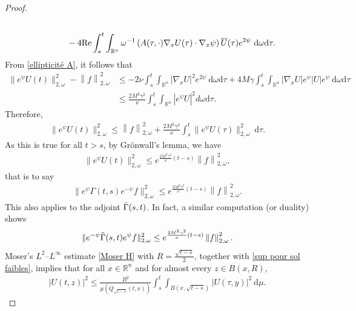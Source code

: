 \documentclass[12pt, letterpaper]{amsart}
\theoremstyle{definition}
\theoremstyle{remark}
\numberwithin{equation}{section}
\begin{document}
\begin{proof}
\begin{align*}
    \\ & \hspace{1.5cm}- 4\mathrm{Re} \int_{s}^{t} \int_{\mathbb{R}^n} \omega^{-1}\left ( A(\tau,\cdot)\nabla_x U(\tau)\cdot \nabla_x \psi \right )\overline{U}(\tau) e^{2\psi} \ \mathrm d \omega \mathrm d \tau.
\end{align*}
From \eqref{ellipticité A}, it follows that
\begin{align*} 
       \|e^{\psi}U(t)   \|^2_{2,\omega}-\left \|f  \right \|^2_{2,\omega} &\leq -2\nu \int_{s}^{t} \int_{\mathbb{R}^n} 
       | \nabla_x U  |^2 e^{2\psi} \ \mathrm d \omega \mathrm d \tau + 4M\gamma \int_{s}^{t} \int_{\mathbb{R}^n}  | \nabla_x U  | e^\psi \left | U \right |e^{\psi} \ \mathrm d \omega \mathrm d \tau
      \\& \leq \frac{2M^2 \gamma^2}{\nu} \int_{s}^{t} \int_{\mathbb{R}^n} |e^{\psi} U  |^2  d \omega \mathrm d \tau.
\end{align*}
Therefore, 
\begin{align*}
  \|e^{\psi}U(t)   \|^2_{2,\omega} \leq \left \|f  \right \|^2_{2,\omega} + \frac{2M^2 \gamma^2}{\nu} \int_{s}^{t}   \|e^{\psi}U(\tau)  \|^2_{2,\omega} \ \mathrm{d}\tau.
\end{align*}
As this is true for all $t>s$, by Grönwall's lemma, we have
\begin{align}\label{UUUU}
       \|e^{\psi}U(t)  \|^2_{2,\omega} \leq e^{\frac{2M^2\gamma^2}{\nu}(t-s)}\left \|f  \right \|^2_{2,\omega},
\end{align}
that is to say
\begin{align*}
      \|e^{\psi}\Gamma(t,s)e^{-\psi}f  \|^2_{2,\omega} \leq e^{\frac{2M^2\gamma^2}{\nu}(t-s)}\left \|f  \right \|^2_{2,\omega}.
\end{align*}
This also applies to the adjoint $\Tilde{\Gamma}(s,t)$. In fact, a similar computation (or duality) shows  
\begin{equation*}
    \|e^{-\psi}\Tilde{\Gamma}(s,t)e^{\psi}f  \|^2_{2,\omega} \leq e^{\frac{2M^2\gamma^2}{\nu}(t-s)}\left \|f  \right \|^2_{2,\omega}.
\end{equation*}
Moser’s $L^2$–$L^\infty$ estimate \eqref{Moser H} with $R = \frac{\sqrt{t-s}}{2}$, together with \eqref{sup pour sol faibles}, implies that for all $x \in \mathbb{R}^n$ and for almost every $z \in B(x,R)$,
\begin{align*}
    \left | U(t,z) \right |^2\leq \frac{B^2}{\mu(Q_{\sqrt{t-s}}(t,x))}\int_{s}^{t}
\int_{B(x,\sqrt{t-s})} \left | U(\tau,y) \right |^2\ \mathrm d\mu.
\end{align*}

\end{proof}
\end{document}
